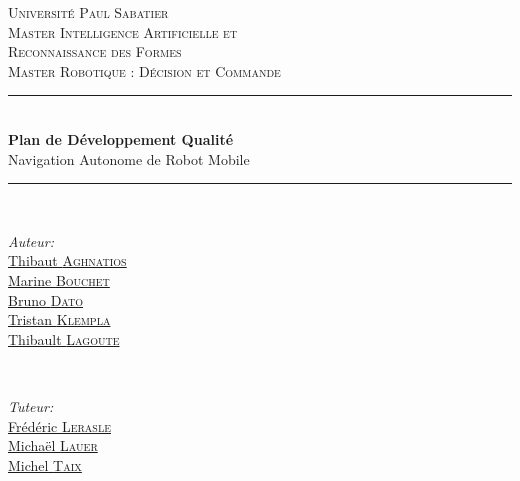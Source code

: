 \documentclass[10pt,a4paper]{article}
\begin{document}
\begin{titlepage}

\newcommand{\HRule}{\rule{\linewidth}{0.5mm}} 

\center

\textsc{\Large Université Paul Sabatier}\\[1cm] 


\textsc{Master Intelligence Artificielle et \\ 
Reconnaissance des Formes \\ Master Robotique : Décision et Commande}\\[3cm] 

\HRule \\[0.4cm]
{ \huge \bfseries Plan de Développement Qualité}\\[0.4cm] 
\LARGE Navigation Autonome de Robot Mobile

\HRule \\[1.5cm]
 

\begin{minipage}{0.4\textwidth}
\begin{flushleft} \large
\emph{Auteur:}\\
\href{mailto:thibaut.aghnatios@laposte.net}{Thibaut \textsc{Aghnatios} }  \\
\href{mailto:bouchetmarinee@gmail.com}{Marine \textsc{Bouchet} } \\
\href{mailto:bruno.dato.meneses@gmail.com}{Bruno \textsc{Dato} } \\
\href{mailto:klempka.tristan@gmail.com}{Tristan \textsc{Klempla} } \\
\href{mailto:lagoute.31@gmail.com}{Thibault \textsc{Lagoute} }  
\end{flushleft}
\end{minipage}
~
\begin{minipage}{0.4\textwidth}
\begin{flushright} \large
\emph{Tuteur:} \\
\href{mailto:lerasle@laas.fr}{Frédéric \textsc{Lerasle}}\\
\href{mailto:michael.lauer@laas.fr}{Michaël \textsc{Lauer}} \\
\href{mailto:taix@laas.f}{Michel \textsc{Taix}}
\end{flushright}
\end{minipage}\\[1cm]

 

\end{titlepage}
\end{document}
